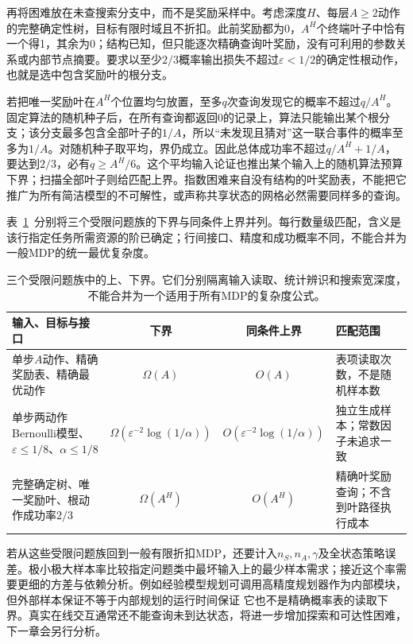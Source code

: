 再将困难放在未查搜索分支中，而不是奖励采样中。考虑深度$H$、每层$A\geq2$动作的完整确定性树，目标有限时域且不折扣。此前奖励都为0，$A^H$个终端叶子中恰有一个得1，其余为0；结构已知，但只能逐次精确查询叶奖励，没有可利用的参数关系或内部节点摘要。要求以至少$2/3$概率输出损失不超过$\varepsilon<1/2$的确定性根动作，也就是选中包含奖励叶的根分支。

若把唯一奖励叶在$A^H$个位置均匀放置，至多$q$次查询发现它的概率不超过$q/A^H$。固定算法的随机种子后，在所有查询都返回0的记录上，算法只能输出某个根分支；该分支最多包含全部叶子的$1/A$，所以“未发现且猜对”这一联合事件的概率至多为$1/A$。对随机种子取平均，界仍成立。因此总体成功率不超过$q/A^H+1/A$，要达到$2/3$，必有$q\geq A^H/6$。这个平均输入论证也推出某个输入上的随机算法预算下界；扫描全部叶子则给匹配上界。指数困难来自没有结构的叶奖励表，不能把它推广为所有简洁模型的不可解性，或声称共享状态的网格必然需要同样多的查询。

表~\ref{tab:rl-planning-bounds}~分别将三个受限问题族的下界与同条件上界并列。每行数量级匹配，含义是该行指定任务所需资源的阶已确定；行间接口、精度和成功概率不同，不能合并为一般MDP的统一最优复杂度。

\begin{table}[htbp]
 \centering
 \small
 \begin{tabularx}{\linewidth}{@{}>{\raggedright\arraybackslash}Xcc>{\raggedright\arraybackslash}X@{}}
  \toprule
  输入、目标与接口 & 下界 & 同条件上界 & 匹配范围\\
  \midrule
  单步$A$动作、精确奖励表、精确最优动作 & $\Omega(A)$ & $O(A)$ & 表项读取次数，不是随机样本数\\
  单步两动作Bernoulli模型、$\varepsilon\leq1/8$、$\alpha\leq1/8$ & $\Omega(\varepsilon^{-2}\log(1/\alpha))$ & $O(\varepsilon^{-2}\log(1/\alpha))$ & 独立生成样本；常数因子未追求一致\\
  完整确定树、唯一奖励叶、根动作成功率$2/3$ & $\Omega(A^H)$ & $O(A^H)$ & 精确叶奖励查询；不含到叶路径执行成本\\
  \bottomrule
 \end{tabularx}
 \caption{三个受限问题族中的上、下界。它们分别隔离输入读取、统计辨识和搜索宽深度，不能合并为一个适用于所有MDP的复杂度公式。}
 \label{tab:rl-planning-bounds}
\end{table}

若从这些受限问题族回到一般有限折扣MDP，还要计入$n_S,n_A,\gamma$及全状态策略误差。极小极大样本率比较指定问题类中最坏输入上的最少样本需求；接近这个率需要更细的方差与依赖分析。例如经验模型规划可调用高精度规划器作为内部模块，但外部样本保证不等于内部规划的运行时间保证
它也不是精确概率表的读取下界。真实在线交互通常还不能查询未到达状态，将进一步增加探索和可达性困难，下一章会另行分析。

